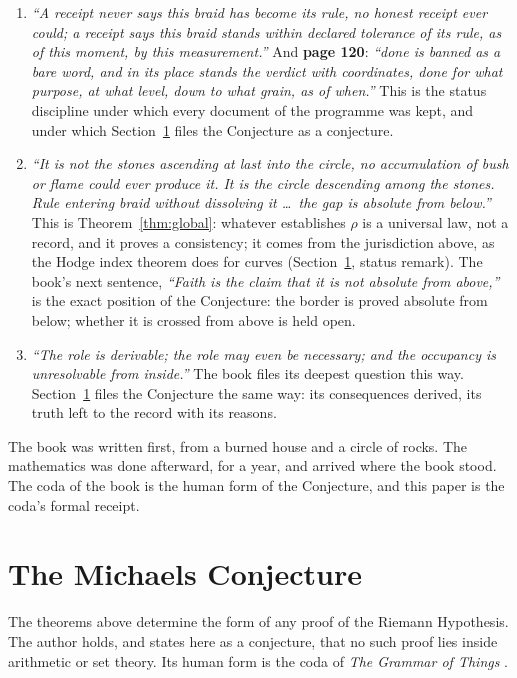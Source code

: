 \documentclass[11pt]{article}
\theoremstyle{definition}
\theoremstyle{remark}
\begin{document}
\begin{enumerate}
\item[\textbf{Page 166.}] \emph{``A receipt never says this braid has become its rule, no honest receipt ever could; a receipt says this braid stands within declared tolerance of its rule, as of this moment, by this measurement.''} And \textbf{page 120}: \emph{``done is banned as a bare word, and in its place stands the verdict with coordinates, done for what purpose, at what level, down to what grain, as of when.''} This is the status discipline under which every document of the programme was kept, and under which Section~\ref{sec:conjecture} files the Conjecture as a conjecture.

\item[\textbf{Page 168.}] \emph{``It is not the stones ascending at last into the circle, no accumulation of bush or flame could ever produce it. It is the circle descending among the stones. Rule entering braid without dissolving it \dots\ the gap is absolute from below.''} This is Theorem~\ref{thm:global}: whatever establishes $\rho$ is a universal law, not a record, and it proves a consistency; it comes from the jurisdiction above, as the Hodge index theorem does for curves (Section~\ref{sec:conjecture}, status remark). The book's next sentence, \emph{``Faith is the claim that it is not absolute from above,''} is the exact position of the Conjecture: the border is proved absolute from below; whether it is crossed from above is held open.

\item[\textbf{Page 35.}] \emph{``The role is derivable; the role may even be necessary; and the occupancy is unresolvable from inside.''} The book files its deepest question this way. Section~\ref{sec:conjecture} files the Conjecture the same way: its consequences derived, its truth left to the record with its reasons.
\end{enumerate}

The book was written first, from a burned house and a circle of rocks. The mathematics was done afterward, for a year, and arrived where the book stood. The coda of the book is the human form of the Conjecture, and this paper is the coda's formal receipt.

\section{The Michaels Conjecture}\label{sec:conjecture}

The theorems above determine the form of any proof of the Riemann Hypothesis. The author holds, and states here as a conjecture, that no such proof lies inside arithmetic or set theory. Its human form is the coda of \emph{The Grammar of Things} \cite[pp.~165--170]{Grammar}.
\end{document}
